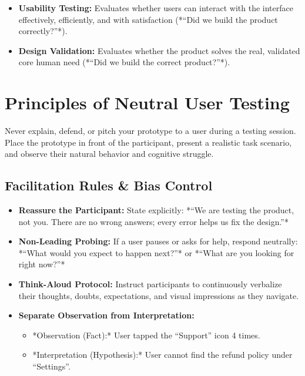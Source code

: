 \begin{definition}
\begin{itemize}[leftmargin=1.2em, itemsep=3pt]
    \item \textbf{Usability Testing:} Evaluates whether users can interact with the interface effectively, efficiently, and with satisfaction (*``Did we build the product correctly?''*).
    \item \textbf{Design Validation:} Evaluates whether the product solves the real, validated core human need (*``Did we build the correct product?''*).
\end{itemize}
\end{definition}

\section{Principles of Neutral User Testing}

\begin{keyequation}
Never explain, defend, or pitch your prototype to a user during a testing session. Place the prototype in front of the participant, present a realistic task scenario, and observe their natural behavior and cognitive struggle.
\end{keyequation}

\subsection{Facilitation Rules \& Bias Control}
\begin{itemize}[leftmargin=1.2em, itemsep=3pt]
    \item \textbf{Reassure the Participant:} State explicitly: *``We are testing the product, not you. There are no wrong answers; every error helps us fix the design.''*
    \item \textbf{Non-Leading Probing:} If a user pauses or asks for help, respond neutrally: *``What would you expect to happen next?''* or *``What are you looking for right now?''*
    \item \textbf{Think-Aloud Protocol:} Instruct participants to continuously verbalize their thoughts, doubts, expectations, and visual impressions as they navigate.
    \item \textbf{Separate Observation from Interpretation:}
    \begin{itemize}
        \item *Observation (Fact):* User tapped the ``Support'' icon 4 times.
        \item *Interpretation (Hypothesis):* User cannot find the refund policy under ``Settings''.
    \end{itemize}
\end{itemize}

